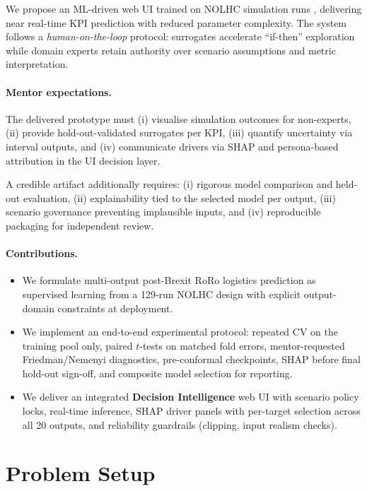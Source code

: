 \documentclass[10pt,twocolumn]{article}
\begin{document}
We propose an ML-driven web UI trained on NOLHC simulation runs \citep{cioppa2007,viana2016,bogoclu2021}, delivering near real-time KPI prediction with reduced parameter complexity.
The system follows a \emph{human-on-the-loop} protocol: surrogates accelerate ``if-then'' exploration while domain experts retain authority over scenario assumptions and metric interpretation.

\paragraph{Mentor expectations.}
The delivered prototype must (i) visualise simulation outcomes for non-experts, (ii) provide hold-out-validated surrogates per KPI, (iii) quantify uncertainty via interval outputs, and (iv) communicate drivers via SHAP and persona-based attribution in the UI decision layer.

A credible artifact additionally requires:
(i) rigorous model comparison and held-out evaluation,
(ii) explainability tied to the selected model per output,
(iii) scenario governance preventing implausible inputs, and
(iv) reproducible packaging for independent review.

\paragraph{Contributions.}
\begin{itemize}
  \item We formulate multi-output post-Brexit RoRo logistics prediction as supervised learning from a 129-run NOLHC design with explicit output-domain constraints at deployment.
  \item We implement an end-to-end experimental protocol: repeated CV on the training pool only, paired $t$-tests on matched fold errors, mentor-requested Friedman/Nemenyi diagnostics, pre-conformal checkpoints, SHAP before final hold-out sign-off, and composite model selection for reporting.
  \item We deliver an integrated \textbf{Decision Intelligence} web UI with scenario policy locks, real-time inference, SHAP driver panels with per-target selection across all 20 outputs, and reliability guardrails (clipping, input realism checks).
\end{itemize}

\section{Problem Setup}
\label{sec:setup}
\end{document}
